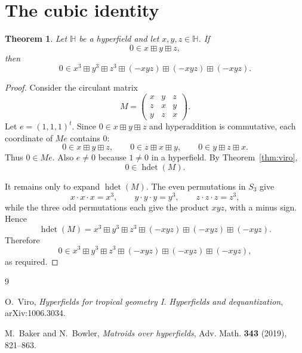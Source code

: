 \documentclass[11pt]{article}
\newcommand{\bplus}{\boxplus}
\DeclareMathOperator{\hdet}{hdet}
\newtheorem{theorem}{Theorem}
\begin{document}
\section*{The cubic identity}

\begin{theorem}
Let $\mathbb H$ be a hyperfield and let $x,y,z\in \mathbb H$. If
\[
0\in x\bplus y\bplus z,
\]
then
\[
0\in x^3\bplus y^3\bplus z^3\bplus (-xyz)\bplus (-xyz)\bplus (-xyz).
\]
\end{theorem}

\begin{proof}
Consider the circulant matrix
\[
M=
\begin{pmatrix}
x & y & z\\
z & x & y\\
y & z & x
\end{pmatrix}.
\]
Let $e=(1,1,1)^t$. Since $0\in x\bplus y\bplus z$ and hyperaddition is
commutative, each coordinate of $Me$ contains $0$:
\[
0\in x\bplus y\bplus z,\qquad
0\in z\bplus x\bplus y,\qquad
0\in y\bplus z\bplus x.
\]
Thus $0\in Me$. Also $e\neq 0$ because $1\neq 0$ in a hyperfield. By
Theorem~\ref{thm:viro},
\[
0\in \hdet(M).
\]

It remains only to expand $\hdet(M)$. The even permutations in $S_3$ give
\[
x\cdot x\cdot x=x^3,\qquad
y\cdot y\cdot y=y^3,\qquad
z\cdot z\cdot z=z^3,
\]
while the three odd permutations each give the product $xyz$, with a minus sign.
Hence
\[
\hdet(M)
=
x^3\bplus y^3\bplus z^3
\bplus (-xyz)\bplus (-xyz)\bplus (-xyz).
\]
Therefore
\[
0\in x^3\bplus y^3\bplus z^3
\bplus (-xyz)\bplus (-xyz)\bplus (-xyz),
\]
as required.
\end{proof}

\begin{thebibliography}{9}

O.~Viro,
\emph{Hyperfields for tropical geometry I. Hyperfields and dequantization},
arXiv:1006.3034.

M.~Baker and N.~Bowler,
\emph{Matroids over hyperfields},
Adv. Math. \textbf{343} (2019), 821--863.

\end{thebibliography}
\end{document}
